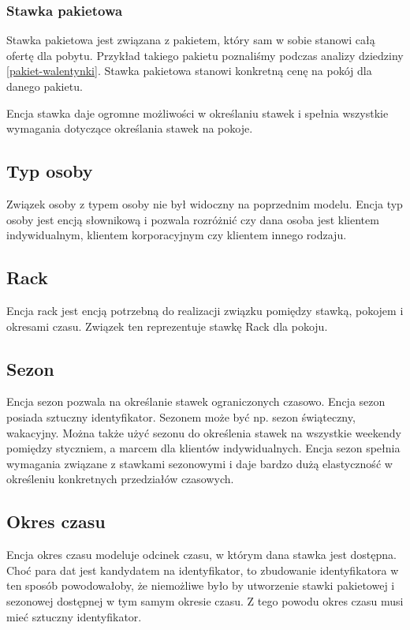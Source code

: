 \documentclass[a4paper,onecolumn,oneside,11pt,wide,floatssmall]{mwrep}
\theoremstyle{definition}
\theoremstyle{plain}%
\theoremstyle{remark}
\begin{document}
\subsubsection{Stawka pakietowa}
Stawka pakietowa jest związana z pakietem, który sam w sobie stanowi całą ofertę dla pobytu. Przykład takiego pakietu poznaliśmy podczas analizy dziedziny \ref{pakiet-walentynki}. Stawka pakietowa stanowi konkretną cenę na pokój dla danego pakietu.

Encja stawka daje ogromne możliwości w określaniu stawek i spełnia wszystkie wymagania dotyczące określania stawek na pokoje.

\subsection{Typ osoby}
Związek osoby z typem osoby nie był widoczny na poprzednim modelu. Encja typ osoby jest encją słownikową i pozwala rozróżnić czy dana osoba jest klientem indywidualnym, klientem korporacyjnym czy klientem innego rodzaju. 

\subsection{Rack}
Encja rack jest encją potrzebną do realizacji związku pomiędzy stawką, pokojem i okresami czasu. Związek ten reprezentuje stawkę Rack dla pokoju.

\subsection{Sezon}
Encja sezon pozwala na określanie stawek ograniczonych czasowo. Encja sezon posiada sztuczny identyfikator. Sezonem może być np. sezon świąteczny, wakacyjny. Można także użyć sezonu do określenia stawek na wszystkie weekendy pomiędzy styczniem, a marcem dla klientów indywidualnych. Encja sezon spełnia wymagania związane z stawkami sezonowymi i daje bardzo dużą elastyczność w określeniu konkretnych przedziałów czasowych.

\subsection{Okres czasu}
Encja okres czasu modeluje odcinek czasu, w którym dana stawka jest dostępna. Choć para dat jest kandydatem na identyfikator, to zbudowanie identyfikatora w ten sposób powodowałoby, że niemożliwe było by utworzenie stawki pakietowej i sezonowej dostępnej w tym samym okresie czasu. Z tego powodu okres czasu musi mieć sztuczny identyfikator.
\end{document}
